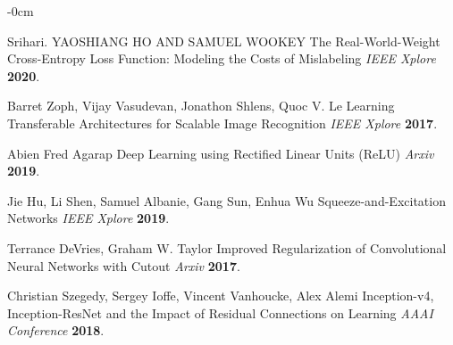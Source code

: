 \documentclass[sensors,article,submit,pdftex,moreauthors]{Definitions/mdpi}
\begin{document}
\begin{adjustwidth}{-\extralength}{0cm}
\begin{thebibliography}{999}
Srihari. YAOSHIANG HO AND SAMUEL WOOKEY The Real-World-Weight Cross-Entropy Loss Function: Modeling the Costs of Mislabeling 
{\em IEEE Xplore} 
{\bf 2020}.

Barret Zoph, Vijay Vasudevan, Jonathon Shlens, Quoc V. Le Learning Transferable Architectures for Scalable Image Recognition 
{\em IEEE Xplore} 
{\bf 2017}.

Abien Fred Agarap Deep Learning using Rectified Linear Units (ReLU) 
{\em Arxiv} 
{\bf 2019}.

Jie Hu, Li Shen, Samuel Albanie, Gang Sun, Enhua Wu Squeeze-and-Excitation Networks 
{\em IEEE Xplore} 
{\bf 2019}.

Terrance DeVries, Graham W. Taylor Improved Regularization of Convolutional Neural Networks with Cutout 
{\em Arxiv} 
{\bf 2017}.

Christian Szegedy, Sergey Ioffe, Vincent Vanhoucke, Alex Alemi Inception-v4, Inception-ResNet and the Impact of Residual Connections on Learning
{\em AAAI Conference} 
{\bf 2018}.

\end{thebibliography}

%


\end{adjustwidth}
\end{document}

